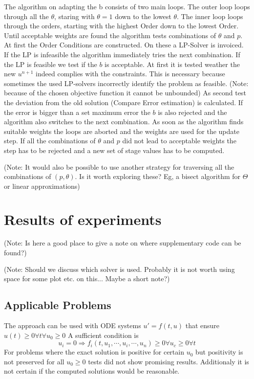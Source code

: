 \documentclass[a4paper]{scrartcl}
\numberwithin{equation}{section}
\theoremstyle{plain}
\theoremstyle{definition}
\numberwithin{theorem}{section}
\newcommand{\1}{\mathbbm{1}}
\begin{document}
The algorithm on adapting the b consists of two main loops. The outer loop loops through all the $\theta$, staring with $\theta = 1$ down to the lowest $\theta$. The inner loop loops through the orders, starting with the highest Order down to the lowest Order. 
Until acceptable weights are found the algorithm tests combinations of $\theta$ and $p$. At first the Order Conditions are constructed. On these a LP-Solver is invoiced. If the LP is infeasible the algorithm immediately tries the next combination. If the LP is feasible we test if the $b$ is acceptable. At first it is tested weather the new $u^{n+1}$ indeed complies with the constraints. This is necessary because sometimes the used LP-solvers incorrectly identify the problem as feasible. (Note: because of the chosen objective function it cannot be unbounded) As second test the deviation from the old solution (Compare Error estimation) is calculated. If the error is bigger than a set maximum error the $b$ is also rejected and the algorithm also switches to the next combination.
As soon as the algorithm finds suitable weights the loops are aborted and the weights are used for the update step.
If all the combinations of $\theta$ and $p$ did not lead to acceptable weights the step has to be rejected and a new set of stage values has to be computed.

(Note: It would also be possible to use another strategy for traversing all the combinations of $(p,\theta)$. Is it worth exploring these? Eg, a bisect algorithm for $\Theta$ or linear approximations)


\section{Results of experiments}\label{sec:Numeric_Results}

(Note: Is here a good place to give a note on where supplementary code can be found?)

(Note: Should we discuss which solver is used. Probably it is not worth using space for some plot etc. on this... Maybe a short note?)

\subsection{Applicable Problems}\label{sec:app_problem}
The approach can be used with ODE systems $u' = f(t,u)$ that ensure  $u(t) \geq 0 \forall t \forall {  u_0 \geq 0}$ 
A sufficient condition is  
\begin{equation}
u_i=0 \Rightarrow f_i(t,u_1,\cdots,u_i,\cdots,u_n) \geq 0  \forall {u_c \geq 0} \forall {t}
\end{equation}
For problems where the exact solution is positive for certain $u_0$ but positivity is not preserved for all $u_0 \geq 0$ tests did not show promising results. Additionaly it is not certain if the computed solutions would be reasonable.
\end{document}

